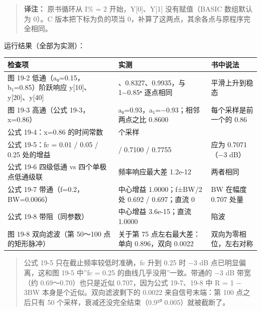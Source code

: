 \begin{quote}
\textbf{译注：} 原书循环从 I\% = 2 开始，Y{[}0{]}、Y{[}1{]}
没有赋值（BASIC 数组默认为 0）。C 版本把下标为负的项当
0，补算了这两点，其余各点与原程序完全相同。
\end{quote}

运行结果（全部为实测）：

{\def\LTcaptype{none} %
\begin{longtable}[]{@{}
  >{\raggedright\arraybackslash}p{}
  >{\raggedright\arraybackslash}p{}
  >{\raggedright\arraybackslash}p{}@{}}
\toprule\noalign{}
\begin{minipage}[b]{\linewidth}\raggedright
检查项
\end{minipage} & \begin{minipage}[b]{\linewidth}\raggedright
实测
\end{minipage} & \begin{minipage}[b]{\linewidth}\raggedright
书中说法
\end{minipage} \\
\midrule\noalign{}
\endhead
\bottomrule\noalign{}
\endlastfoot
图 19-2 低通（a₀=0.15，b₁=0.85）阶跃响应 y{[}10{]}、y{[}20{]}、y{[}40{]}
& 0.1500、0.8327、0.9935，与 1−0.85ⁿ 逐点相同 & 平滑上升到稳态 \\
图 19-3 高通（公式 19-3，x=0.86） & a₀=0.93，a₁=−0.93；相邻两点之比
0.8600 & 每个采样是前一个的 0.86 \\
公式 19-4：x=0.86 的时间常数 & 6.63 个采样 & 6.63 \\
公式 19-5：fc = 0.01 / 0.05 / 0.25 处的增益 & 0.7072 / 0.7100 / 0.7755 &
应为 0.7071（−3 dB） \\
公式 19-6 四级低通 vs 四个单极点低通级联 & 频率响应最大差 1.2e-12 &
两者相同 \\
公式 19-7 带通（f=0.2，BW=0.0066） & 中心增益 1.0000；f±BW/2 处 0.692 /
0.697；直流 0 & BW 在幅度 0.707 处量 \\
公式 19-8 带阻（同参数） & 中心增益 3.6e-15；直流 1.0000 & 陷波 \\
图 19-8 双向滤波（第 50～100 点的矩形脉冲） & 关于第 75
点左右最大差：单向 0.896，双向 0.0022 & 双向为零相位，左右对称 \\
\end{longtable}
}

\begin{quote}
公式 19-5 只在截止频率较低时准确，fc 升到 0.25 时 −3 dB
点已明显偏离，这和图 19-5 中''fc = 0.25 的曲线几乎没用''一致。带通的 −3
dB 带宽（约 0.69～0.70）也只是近似 0.707，因为公式 19-7、19-8 中 R = 1 −
3BW 本身是个近似。双向滤波剩下的 0.0022 来自信号末端：第 100 点之后只有
50 个采样，衰减还没完全结束（0.9⁵⁰  0.005）就被截断了。
\end{quote}

